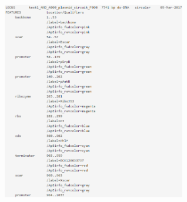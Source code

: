 \documentclass[11pt]{article}
\begin{document}
\begin{figure}[ht!]
\centering
\includegraphics[width=8cm,height=20cm,keepaspectratio]{fout_1.png}

\end{figure}
\end{document}
